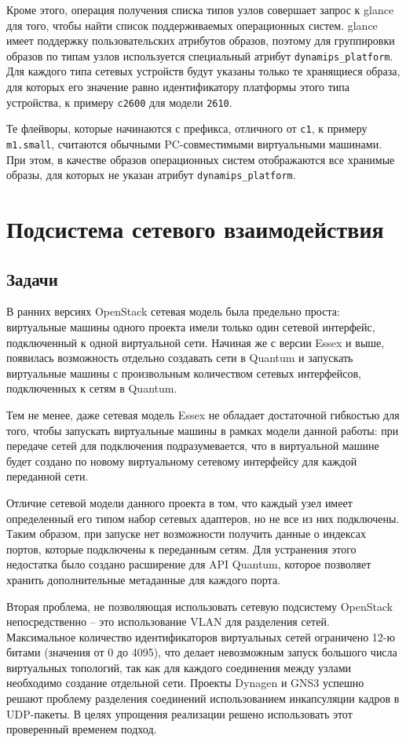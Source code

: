 Кроме этого, операция получения списка типов узлов совершает запрос к glance для того, чтобы 
найти список поддерживаемых операционных систем.  glance имеет поддержку пользовательских
атрибутов образов, поэтому для группировки образов по типам узлов используется специальный
атрибут \verb`dynamips_platform`.
Для каждого типа сетевых устройств будут указаны
только те хранящиеся образа, для которых его значение равно идентификатору платформы
этого типа устройства, к примеру \verb`c2600` для модели \verb`2610`.

Те флейворы, которые начинаются с префикса, отличного от \verb`c1`, к примеру
\verb`m1.small`, считаются обычными PC-совместимыми виртуальными машинами. 
При этом, в качестве образов операционных систем отображаются все хранимые образы, 
для которых не указан атрибут \verb`dynamips_platform`.

\section{Подсистема сетевого взаимодействия}

\subsection{Задачи}
В ранних версиях OpenStack сетевая модель была предельно проста: виртуальные машины
одного проекта имели только один сетевой интерфейс, подключенный к одной виртуальной сети.
Начиная же с версии Essex и выше, появилась возможность отдельно создавать сети в Quantum 
и запускать виртуальные машины с произвольным количеством сетевых интерфейсов, подключенных
к сетям в Quantum.

Тем не менее, даже сетевая модель Essex не обладает достаточной гибкостью для того, чтобы 
запускать виртуальные машины в рамках модели данной работы: при передаче сетей для 
подключения подразумевается, что в виртуальной машине будет создано по новому виртуальному 
сетевому интерфейсу для каждой переданной сети.

Отличие сетевой модели данного проекта в том, что каждый узел имеет определенный
его типом набор сетевых адаптеров, но не все из них подключены. Таким образом, при запуске нет
возможности получить данные о индексах портов, которые подключены к переданным сетям.
Для устранения этого недостатка было создано расширение для API Quantum, которое позволяет
хранить дополнительные метаданные для каждого порта.

Вторая проблема, не позволяющая использовать сетевую подсистему OpenStack непосредственно --
это использование VLAN для разделения сетей. Максимальное количество идентификаторов 
виртуальных сетей ограничено 12-ю битами (значения от 0 до 4095), что делает невозможным
запуск большого числа виртуальных топологий, так как для каждого соединения между узлами
необходимо создание отдельной сети. Проекты Dynagen и GNS3 успешно решают проблему 
разделения соединений использованием инкапсуляции кадров в UDP-пакеты. В целях упрощения
реализации решено использовать этот проверенный временем подход.


